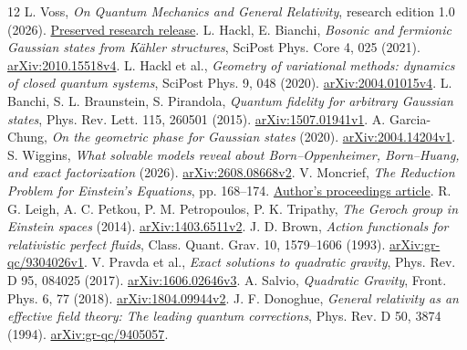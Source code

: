 \documentclass[11pt]{article}
\begin{document}
\begin{thebibliography}{12}
 L. Voss, \emph{On Quantum Mechanics and General Relativity}, research edition 1.0 (2026). \href{https://github.com/LoganVoss/on-quantum-mechanics-and-general-relativity/releases/tag/v1.0.0}{Preserved research release}.
 L. Hackl, E. Bianchi, \emph{Bosonic and fermionic Gaussian states from K\"ahler structures}, SciPost Phys. Core 4, 025 (2021). \href{https://arxiv.org/abs/2010.15518v4}{arXiv:2010.15518v4}.
 L. Hackl et al., \emph{Geometry of variational methods: dynamics of closed quantum systems}, SciPost Phys. 9, 048 (2020). \href{https://arxiv.org/abs/2004.01015v4}{arXiv:2004.01015v4}.
 L. Banchi, S. L. Braunstein, S. Pirandola, \emph{Quantum fidelity for arbitrary Gaussian states}, Phys. Rev. Lett. 115, 260501 (2015). \href{https://arxiv.org/abs/1507.01941v1}{arXiv:1507.01941v1}.
 A. Garcia-Chung, \emph{On the geometric phase for Gaussian states} (2020). \href{https://arxiv.org/abs/2004.14204v1}{arXiv:2004.14204v1}.
 S. Wiggins, \emph{What solvable models reveal about Born--Oppenheimer, Born--Huang, and exact factorization} (2026). \href{https://arxiv.org/abs/2608.08668v2}{arXiv:2608.08668v2}.
 V. Moncrief, \emph{The Reduction Problem for Einstein's Equations}, pp. 168--174. \href{https://maths.anu.edu.au/files/CMAProcVol19-Moncrief.pdf}{Author's proceedings article}.
 R. G. Leigh, A. C. Petkou, P. M. Petropoulos, P. K. Tripathy, \emph{The Geroch group in Einstein spaces} (2014). \href{https://arxiv.org/abs/1403.6511v2}{arXiv:1403.6511v2}.
 J. D. Brown, \emph{Action functionals for relativistic perfect fluids}, Class. Quant. Grav. 10, 1579--1606 (1993). \href{https://arxiv.org/abs/gr-qc/9304026v1}{arXiv:gr-qc/9304026v1}.
 V. Pravda et al., \emph{Exact solutions to quadratic gravity}, Phys. Rev. D 95, 084025 (2017). \href{https://arxiv.org/abs/1606.02646v3}{arXiv:1606.02646v3}.
 A. Salvio, \emph{Quadratic Gravity}, Front. Phys. 6, 77 (2018). \href{https://arxiv.org/abs/1804.09944v2}{arXiv:1804.09944v2}.
 J. F. Donoghue, \emph{General relativity as an effective field theory: The leading quantum corrections}, Phys. Rev. D 50, 3874 (1994). \href{https://arxiv.org/abs/gr-qc/9405057}{arXiv:gr-qc/9405057}.
\end{thebibliography}
\end{document}
